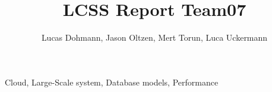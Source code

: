 \documentclass[lettersize,journal]{IEEEtran}
\begin{document}
\title{LCSS Report Team07}
\author{Lucas Dohmann, Jason Oltzen, Mert Torun, Luca Uckermann}

\maketitle


\begin{IEEEkeywords}
Cloud, Large-Scale system, Database models, Performance
\end{IEEEkeywords}

{}



%
%
%
\newpage


\end{document}

